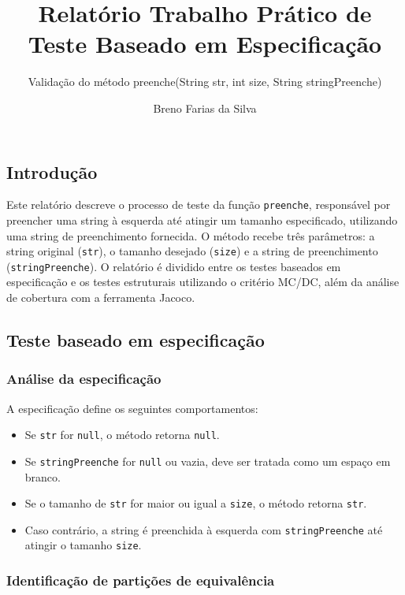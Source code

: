 \documentclass[
  letterpaper,
  DIV=11,
  numbers=noendperiod]{scrartcl}
\title{Relatório Trabalho Prático de Teste Baseado em Especificação}
\subtitle{Validação do método preenche(String str, int size, String
stringPreenche)}
\author{Breno Farias da Silva}
\date{}
\providecommand{\tightlist}{%
  \setlength{\itemsep}{0pt}\setlength{\parskip}{0pt}}
\renewcommand*\contentsname{Table of contents}
\newcommand\contentsname{Table of contents}
\begin{document}
\maketitle

\renewcommand*\contentsname{Sumário}
{
\hypersetup{linkcolor=}
\setcounter{tocdepth}{3}
\tableofcontents
}

\subsection{Introdução}\label{introduuxe7uxe3o}

Este relatório descreve o processo de teste da função \texttt{preenche},
responsável por preencher uma string à esquerda até atingir um tamanho
especificado, utilizando uma string de preenchimento fornecida. O método
recebe três parâmetros: a string original (\texttt{str}), o tamanho
desejado (\texttt{size}) e a string de preenchimento
(\texttt{stringPreenche}). O relatório é dividido entre os testes
baseados em especificação e os testes estruturais utilizando o critério
MC/DC, além da análise de cobertura com a ferramenta Jacoco.

\subsection{Teste baseado em
especificação}\label{teste-baseado-em-especificauxe7uxe3o}

\subsubsection{Análise da
especificação}\label{anuxe1lise-da-especificauxe7uxe3o}

A especificação define os seguintes comportamentos:

\begin{itemize}
\tightlist
\item
  Se \texttt{str} for \texttt{null}, o método retorna \texttt{null}.
\item
  Se \texttt{stringPreenche} for \texttt{null} ou vazia, deve ser
  tratada como um espaço em branco.
\item
  Se o tamanho de \texttt{str} for maior ou igual a \texttt{size}, o
  método retorna \texttt{str}.
\item
  Caso contrário, a string é preenchida à esquerda com
  \texttt{stringPreenche} até atingir o tamanho \texttt{size}.
\end{itemize}

\subsubsection{Identificação de partições de
equivalência}\label{identificauxe7uxe3o-de-partiuxe7uxf5es-de-equivaluxeancia}
\end{document}
